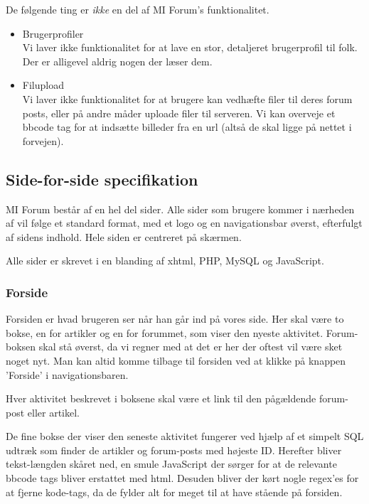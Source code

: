 \documentclass{article}
\begin{document}
De følgende ting er \emph{ikke} en del af MI Forum's funktionalitet.

\begin{itemize}
	\item Brugerprofiler \\
	Vi laver ikke funktionalitet for at lave en stor, detaljeret brugerprofil til folk. Der er alligevel aldrig nogen der læser dem.
	\item Filupload \\
	Vi laver ikke funktionalitet for at brugere kan vedhæfte filer til deres forum posts, eller på andre måder uploade filer til serveren. Vi kan overveje et bbcode tag for at indsætte billeder fra en url (altså de skal ligge på nettet i forvejen).
\end{itemize}

\subsection{Side-for-side specifikation}

MI Forum består af en hel del sider. Alle sider som brugere kommer i nærheden af vil følge et standard format, med et logo og en navigationsbar øverst, efterfulgt af sidens indhold. Hele siden er centreret på skærmen.

Alle sider er skrevet i en blanding af xhtml, PHP, MySQL og JavaScript.

\subsubsection{Forside}

Forsiden er hvad brugeren ser når han går ind på vores side. Her skal være to bokse, en for artikler og en for forummet, som viser den nyeste aktivitet. Forum-boksen skal stå øverst, da vi regner med at det er her der oftest vil være sket noget nyt. Man kan altid komme tilbage til forsiden ved at klikke på knappen 'Forside' i navigationsbaren.

Hver aktivitet beskrevet i boksene skal være et link til den pågældende forum-post eller artikel.

De fine bokse der viser den seneste aktivitet fungerer ved hjælp af et simpelt SQL udtræk som finder de artikler og forum-posts med højeste ID. Herefter bliver tekst-længden skåret ned, en smule JavaScript der sørger for at de relevante bbcode tags bliver erstattet med html. Desuden bliver der kørt nogle regex'es for at fjerne kode-tags, da de fylder alt for meget til at have stående på forsiden.
\end{document}
